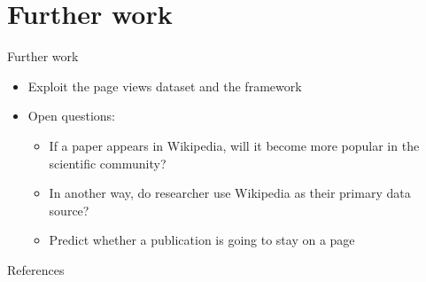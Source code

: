 \documentclass{beamer}
\begin{document}
\section{Further work}

\begin{frame}{Further work}
    \begin{itemize}
        \item Exploit the page views dataset and the framework
        \item Open questions:
        \begin{itemize}
            \item If a paper appears in Wikipedia, will it become more popular in the scientific community?
            \item In another way, do researcher use Wikipedia as their primary data source?
            \item Predict whether a publication is going to stay on a page
        \end{itemize}
    \end{itemize}
\end{frame}

\appendix

\begin{frame}{References}
    
    
\end{frame}
\end{document}
